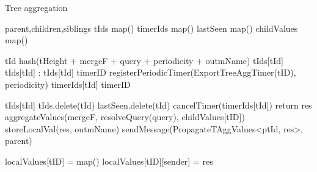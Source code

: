 \begin{algorithm}
\caption{Tree aggregation} \label{alg:mon:tree_agg}
\begin{algorithmic}[1]

    \asdstate \label{alg:mon:tree_agg:state}
        \State parent,children,siblings 
        \State tIds \asdassign map()
        \State timerIds \asdassign map()
        \State lastSeen \asdassign map()
        \State childValues \asdassign map()
    \asdend

    \label{alg:mon:tree_agg:start_req}
        \State tId \asdassign hash(tHeight + mergeF + query + periodicity + outmName) \label{alg:mon:tree_agg:start_req_start}
            \State <tHeight, mergeF, query, periodicity, outmName, isLocal, isParentSub, ptId> \asdassign tIds[tId]
            \State tIds[tId] \asdassign <tHeight, mergeF, query, periodicity, outmName, true, isParentSub, ptId>
        \Else:
        \State tIds[tId] \asdassign <tHeight, mergeF, query, periodicity, outmName, true, false, nil>
        \State timerID \asdassign registerPeriodicTimer(ExportTreeAggTimer(tID), periodicity)
        \State timerIds[tId] \asdassign timerID
        \EndIf\label{alg:mon:tree_agg:start_req_end}
    \asdend

     \label{alg:mon:tree_agg:export_trigger}
        \State <tHeight, mergeF, query, periodicity, outmName, isLocal, isParentSub, ptId> \asdassign tIds[tId]
                \State tIds.delete(tId)
                \State lastSeen.delete(tId)
                \State cancelTimer(timerIds[tId])
                \State return
            \EndIf
        \EndIf
        \State res \asdassign aggregateValues(mergeF, resolveQuery(query), childValues[tID])
            \State storeLocalVal(res, outmName)
        \EndIf 
            \State sendMessage(PropagateTAggValues<ptId, res>, parent)
        \EndIf
    \asdend

     \label{alg:mon:tree_agg:recv_propag_vals}
                \State localValues[tID] = map()
            \EndIf
            \State localValues[tID][sender] = res
        \EndIf
    \asdend


\end{algorithmic}
\end{algorithm}
